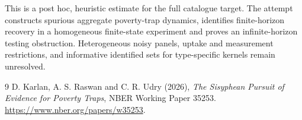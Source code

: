 \documentclass[11pt]{article}
\theoremstyle{definition}
\begin{document}
This is a post hoc, heuristic estimate for the full catalogue target.
The attempt constructs spurious aggregate poverty-trap dynamics, identifies finite-horizon recovery in a homogeneous finite-state experiment and proves an infinite-horizon testing obstruction. Heterogeneous noisy panels, uptake and measurement restrictions, and informative identified sets for type-specific kernels remain unresolved.

\begin{thebibliography}{9}
 D. Karlan, A. S. Raswan and C. R. Udry (2026),
\emph{The Sisyphean Pursuit of Evidence for Poverty Traps}, NBER Working
Paper 35253. \url{https://www.nber.org/papers/w35253}.
\end{thebibliography}
\end{document}
